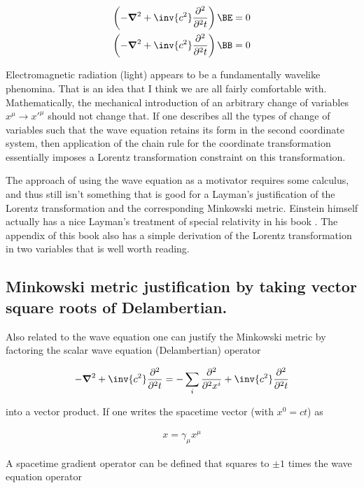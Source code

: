 \documentclass{article}      %
\newcommand{\spacegrad}[0]{\boldsymbol{\nabla}}
\newcommand{\PDsq}[2]{\frac{\partial^2 {#2}}{\partial^2 {#1}}}
\begin{document}
\begin{align*}
\left(-\spacegrad^2 + \inv{c^2}\PDsq{t}{}\right) \BE &= 0 \\
\left(-\spacegrad^2 + \inv{c^2}\PDsq{t}{}\right) \BB &= 0
\end{align*}

Electromagnetic radiation (light) appears to be a fundamentally wavelike phenomina.  That is an idea that I think we are all fairly
comfortable with.  Mathematically, the mechanical introduction of an arbitrary change of variables $x^{\mu} \rightarrow {x'}^{\mu}$
should not change that.  
If one describes all the types of change of variables such that 
the wave equation retains its form in the second coordinate system, then application of the chain rule for the coordinate transformation
essentially imposes a Lorentz transformation constraint on this transformation.  

The approach of using the wave equation as a motivator requires some calculus, and thus still isn't something that
is good for a Layman's justification of the
Lorentz transformation and the corresponding Minkowski metric.  Einstein himself actually has a nice Layman's treatment of
special relativity in his book \cite{einstein2005rsa}.  The appendix of this book also has a simple derivation of the Lorentz transformation
in two variables that is well worth reading.

\subsection{ Minkowski metric justification by taking vector square roots of Delambertian. }

Also related to the wave equation one can justify the Minkowski metric by factoring the scalar wave equation (Delambertian) operator

\begin{align*}
-\spacegrad^2 + \inv{c^2}\PDsq{t}{} = -\sum_i \PDsq{x^{i}}{} +\inv{c^2}\PDsq{t}{}
\end{align*}

into a vector product.  If one writes the spacetime vector (with $x^0 = ct$) as

\begin{align*}
x = \gamma_{\mu} x^{\mu}
\end{align*}

A spacetime gradient operator can be defined that squares to $\pm 1$ times the wave equation operator
\end{document}
